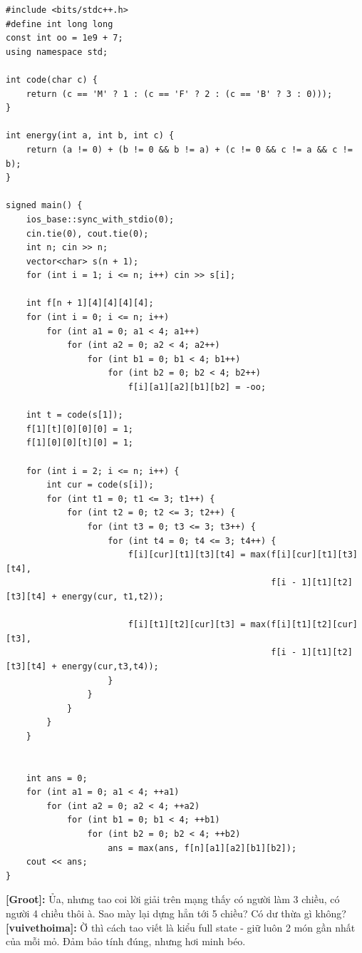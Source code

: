 \begin{lstlisting}[title=\centering\textbf{Cài đặt}]
#include <bits/stdc++.h>
#define int long long
const int oo = 1e9 + 7;
using namespace std;

int code(char c) {
    return (c == 'M' ? 1 : (c == 'F' ? 2 : (c == 'B' ? 3 : 0)));
}

int energy(int a, int b, int c) {
    return (a != 0) + (b != 0 && b != a) + (c != 0 && c != a && c != b);
}

signed main() {
    ios_base::sync_with_stdio(0); 
    cin.tie(0), cout.tie(0);
    int n; cin >> n;
    vector<char> s(n + 1);
    for (int i = 1; i <= n; i++) cin >> s[i];

    int f[n + 1][4][4][4][4];
    for (int i = 0; i <= n; i++)
        for (int a1 = 0; a1 < 4; a1++)
            for (int a2 = 0; a2 < 4; a2++)
                for (int b1 = 0; b1 < 4; b1++)
                    for (int b2 = 0; b2 < 4; b2++)
                        f[i][a1][a2][b1][b2] = -oo;

    int t = code(s[1]);
    f[1][t][0][0][0] = 1;
    f[1][0][0][t][0] = 1;

    for (int i = 2; i <= n; i++) {
        int cur = code(s[i]);
        for (int t1 = 0; t1 <= 3; t1++) {
            for (int t2 = 0; t2 <= 3; t2++) {
                for (int t3 = 0; t3 <= 3; t3++) {
                    for (int t4 = 0; t4 <= 3; t4++) {
                        f[i][cur][t1][t3][t4] = max(f[i][cur][t1][t3][t4],
                                                    f[i - 1][t1][t2][t3][t4] + energy(cur, t1,t2));
                        
                        f[i][t1][t2][cur][t3] = max(f[i][t1][t2][cur][t3],
                                                    f[i - 1][t1][t2][t3][t4] + energy(cur,t3,t4));
                    }
                }
            }
        }
    }


    int ans = 0;
    for (int a1 = 0; a1 < 4; ++a1)
        for (int a2 = 0; a2 < 4; ++a2)
            for (int b1 = 0; b1 < 4; ++b1)
                for (int b2 = 0; b2 < 4; ++b2)
                    ans = max(ans, f[n][a1][a2][b1][b2]);
    cout << ans;
}
\end{lstlisting}

\textbf{[Groot]:} Ủa, nhưng tao coi lời giải trên mạng thấy có người làm 3 chiều, có người 4 chiều thôi à. Sao mày lại dựng hẳn tới 5 chiều? Có dư thừa gì không?\\

\textbf{[vuivethoima]:} Ờ thì cách tao viết là kiểu full state - giữ luôn 2 món gần nhất của mỗi mỏ. Đảm bảo tính đúng, nhưng hơi minh béo. \\

